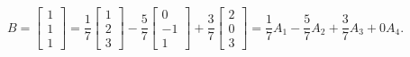 \documentclass[pdf
,handout
]{beamer}
\begin{document}
{{\begin{solution}
\[ B = \left[\begin{array}{r} 1 \\ 1\\ 1 \end{array}\right]
= \frac{1}{7} \left[\begin{array}{r} 1 \\ 2 \\ 3
\end{array}\right] 
-\frac{5}{7}\left[\begin{array}{r} 0 \\ -1 \\ 1
\end{array}\right] +
\frac{3}{7}\left[\begin{array}{r} 2 \\ 0 \\ 3
\end{array}\right] 
=\frac{1}{7} A_{1} - \frac{5}{7} A_{2} + \frac{3}{7} A_{3} + 0 A_{4}.\]
\end{solution}
}}
\end{document}
